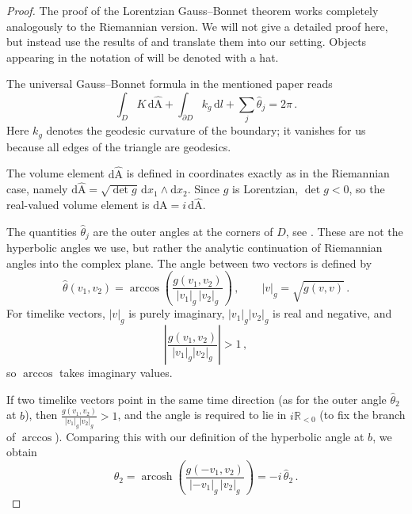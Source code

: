 \documentclass[11pt,reqno]{amsart}
\theoremstyle{definition}
\newcommand{\Cref}[1]{\zcref[S]{#1}}
\theoremstyle{definition}
\theoremstyle{plain}
\theoremstyle{remark}
\DeclareMathOperator{\arccosh}{arcosh}
\begin{document}
\begin{proof}
    The proof of the Lorentzian Gauss--Bonnet theorem works completely analogously to the Riemannian version. 
    We will not give a detailed proof here, but instead use the results of \cite{jee1984} and translate them into our setting. 
    Objects appearing in the notation of \cite{jee1984}
    will be denoted with a hat.

    The universal Gauss--Bonnet formula in the mentioned paper reads
    \begin{equation*}
        \int_D K\, \mathrm{d}\hat{\mathrm{A}}
        + \int_{\partial D} k_g\, \mathrm{d}l 
        + \sum_j \hat{\theta}_j 
        = 2\pi \, .
    \end{equation*}
    Here $k_g$ denotes the geodesic curvature of the boundary; it vanishes for us because all edges of the triangle are geodesics.

    The volume element $\mathrm{d}\hat{\mathrm{A}}$ is defined in coordinates exactly as in the Riemannian case, namely 
    $\mathrm{d}\hat{\mathrm{A}} = \sqrt{\det g}\, \mathrm{d}x_1 \wedge \mathrm{d}x_2$.
    Since $g$ is Lorentzian, $\det g < 0$, so the real-valued volume element is 
    $\mathrm{dA} = i\, \mathrm{d}\hat{\mathrm{A}}$.

    The quantities $\hat{\theta}_j$ are the outer angles at the corners of $D$, see \Cref{fig:placeholder}.  
    These are not the hyperbolic angles we use, but rather the analytic continuation of Riemannian angles into the complex plane.  
    The angle between two vectors is defined by
    \[
        \hat{\theta}(v_1,v_2) = \arccos \left( \frac{g(v_1,v_2)}{|v_1|_g\, |v_2|_g} \right) \, ,
        \qquad |v|_g = \sqrt{g(v,v)} \, .
    \]
    For timelike vectors, $|v|_g$ is purely imaginary, $|v_1|_g|v_2|_g$ is real and negative, and 
    \[
        \left|\frac{g(v_1,v_2)}{|v_1|_g |v_2|_g}\right| > 1 \, ,
    \]
    so $\arccos$ takes imaginary values.

    If two timelike vectors point in the same time direction (as for the outer angle $\hat{\theta}_2$ at $b$), then 
    $\frac{g(v_1,v_2)}{|v_1|_g|v_2|_g} > 1$, and the angle is required to lie in $i\mathbb{R}_{<0}$ (to fix the branch of $\arccos$).
    Comparing this with our definition of the hyperbolic angle at $b$, we obtain
    \begin{equation}\label{eq:GB1}
        \theta_2 
        = \arccosh\!\left( \frac{g(-v_1,v_2)}{|{-v_1}|_g\,|v_2|_g} \right) 
        = -i\, \hat{\theta}_2 \, .
    \end{equation}


\end{proof}
\end{document}
